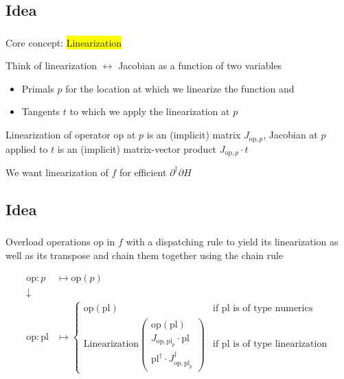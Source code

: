 \documentclass[aspectratio=169,xcolor=dvipsnames]{beamer}
\begin{document}
\subsection{Idea}
\begin{frame}
	\frametitle{\insertsection}
	\framesubtitle{\insertsubsection}

	Core concept: \colorbox{yellow}{Linearization}

	\pause
	\vspace{1em}
	Think of linearization $\leftrightarrow$ Jacobian as a function of two variables
	\begin{itemize}
		\item Primals $p$ for the location at which we linearize the function and
		\item Tangents $t$ to which we apply the linearization at $p$
	\end{itemize}
	\pause
	Linearization of operator $\mathrm{op}$ at $p$ is an (implicit) matrix $J_{\mathrm{op},p}$, Jacobian at $p$ applied to $t$ is an (implicit) matrix-vector product $J_{\mathrm{op},p} \cdot t$

	\pause
	\vspace{1em}
	We want linearization of $f$ for efficient $\partial^\dagger \partial H$

\end{frame}

\subsection{Idea}
\begin{frame}
	\frametitle{\insertsection}
	\framesubtitle{\insertsubsection}

	Overload operations $\mathrm{op}$ in $f$ with a dispatching rule to yield its linearization as well as its transpose and chain them together using the chain rule

	\begin{align*}
		\mathrm{op}: p &\mapsto \mathrm{op}(p)
		\\
		\downarrow
		\\
		\mathrm{op}: \mathrm{pl} &\mapsto
		\begin{cases}
			\mathrm{op}(\mathrm{pl}) & \text{if $\mathrm{pl}$ is of type numerics}
			\\ \text{Linearization}
				\begin{pmatrix}
					\mathrm{op}(\mathrm{pl})
					\\ J_{\mathrm{op},\mathrm{pl}_p} \cdot \mathrm{pl}
					\\ \mathrm{pl}^\dagger \cdot J_{\mathrm{op},\mathrm{pl}_p}^\dagger
				\end{pmatrix}
				& \text{if $\mathrm{pl}$ is of type linearization}
		\end{cases}
	\end{align*}
\end{frame}
\end{document}
